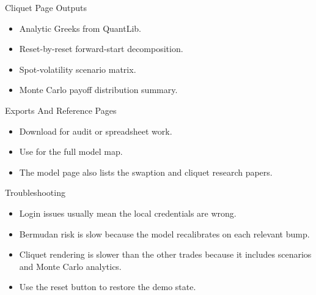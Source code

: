 \documentclass[aspectratio=169]{beamer}
\begin{document}
\begin{frame}{Cliquet Page Outputs}
\begin{itemize}
    \item Analytic Greeks from QuantLib.
    \item Reset-by-reset forward-start decomposition.
    \item Spot-volatility scenario matrix.
    \item Monte Carlo payoff distribution summary.
\end{itemize}
\end{frame}

\begin{frame}{Exports And Reference Pages}
\begin{itemize}
    \item Download  for audit or spreadsheet work.
    \item Use  for the full model map.
    \item The model page also lists the swaption and cliquet research papers.
\end{itemize}
\end{frame}

\begin{frame}{Troubleshooting}
\begin{itemize}
    \item Login issues usually mean the local  credentials are wrong.
    \item Bermudan risk is slow because the model recalibrates on each relevant bump.
    \item Cliquet rendering is slower than the other trades because it includes scenarios and Monte Carlo analytics.
    \item Use the reset button to restore the demo state.
\end{itemize}
\end{frame}
\end{document}
